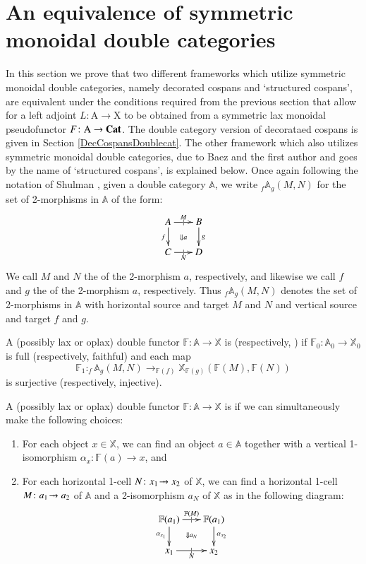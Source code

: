 \documentclass{amsart}
\begin{document}
\section{An equivalence of symmetric monoidal double categories}
In this section we prove that two different frameworks which utilize symmetric monoidal double categories, namely decorated cospans and `structured cospans', are equivalent under the conditions required from the previous section that allow for a left adjoint $L \colon \mathrm{A} \to \mathrm{X}$ to be obtained from a symmetric lax monoidal pseudofunctor $F \colon \mathrm{A} \to \bold{Cat}$. The double category version of decorataed cospans is given in Section \ref{DecCospansDoublecat}. The other framework which also utilizes symmetric monoidal double categories, due to Baez and the first author and goes by the name of `structured cospans', is explained below. Once again following the notation of Shulman \cite{Shul2}, given a double category $\mathbb{A}$, we write $_f \mathbb{A}_g(M,N)$ for the set of 2-morphisms in $\mathbb{A}$ of the form:
\[
  \xymatrix@-.5pc{
    A \ar[r]|{|}^{M}  \ar[d]_f \ar@{}[dr]|{\Downarrow a}&
    B\ar[d]^g\\
    C \ar[r]|{|}_N & D
  }
\]
We call $M$ and $N$ the  of the 2-morphism $a$, respectively, and likewise we call $f$ and $g$ the  of the 2-morphism $a$, respectively. Thus $_f \mathbb{A}_g(M,N)$ denotes the set of 2-morphisms in $\mathbb{A}$ with horizontal source and target $M$ and $N$ and vertical source and target $f$ and $g$.
\begin{defn}
A (possibly lax or oplax) double functor $\mathbb{F} \colon \mathbb{A} \to \mathbb{X}$ is  (respectively, ) if $\mathbb{F}_0 \colon \mathbb{A}_0 \to \mathbb{X}_0$ is full (respectively, faithful) and each map $$\mathbb{F}_1 \colon _f \mathbb{A}_g(M,N) \to _{\mathbb{F}(f)} \mathbb{X}_{\mathbb{F}(g)}(\mathbb{F}(M),\mathbb{F}(N))$$ is surjective (respectively, injective).
\end{defn}
\begin{defn}
A (possibly lax or oplax) double functor $\mathbb{F} \colon \mathbb{A} \to \mathbb{X}$ is  if we can simultaneously make the following choices:
\begin{enumerate}
\item{For each object $x \in \mathbb{X}$, we can find an object $a \in \mathbb{A}$ together with a vertical 1-isomorphism $\alpha_x \colon \mathbb{F}(a) \to x$, and}
\item{For each horizontal 1-cell $N \colon x_1 \tobar x_2$  of $\mathbb{X}$, we can find a horizontal 1-cell $M \colon a_1 \tobar a_2$ of $\mathbb{A}$ and a 2-isomorphism $a_{N}$ of $\mathbb{X}$ as in the following diagram:
\[
  \xymatrix@-.5pc{
    \mathbb{F}(a_1) \ar[r]|{|}^{\mathbb{F}(M)}  \ar[d]_{\alpha_{x_1}} \ar@{}[dr]|{\Downarrow a_N}&
    \mathbb{F}(a_1) \ar[d]^{\alpha_{x_2}}\\
    x_1 \ar[r]|{|}_N & x_2
  }
\]
}
\end{enumerate}
\end{defn}
\end{document}

